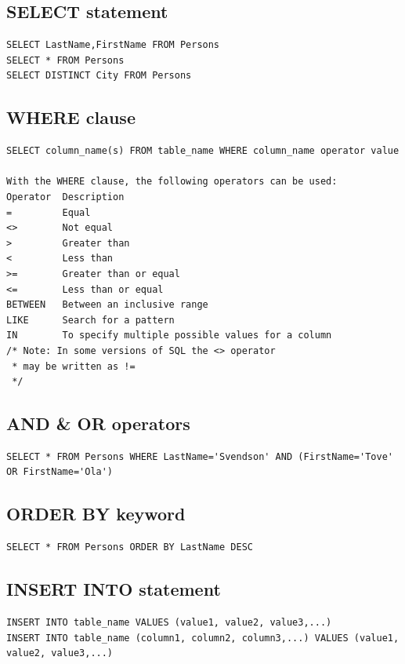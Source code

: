 \subsection{SELECT statement}
\begin{lstlisting}
SELECT LastName,FirstName FROM Persons
SELECT * FROM Persons
SELECT DISTINCT City FROM Persons
\end{lstlisting}

\subsection{WHERE clause}
\begin{lstlisting}
SELECT column_name(s) FROM table_name WHERE column_name operator value

With the WHERE clause, the following operators can be used:
Operator  Description
=         Equal
<>        Not equal
>         Greater than
<         Less than
>=        Greater than or equal
<=        Less than or equal
BETWEEN   Between an inclusive range
LIKE      Search for a pattern
IN        To specify multiple possible values for a column
/* Note: In some versions of SQL the <> operator
 * may be written as !=
 */
\end{lstlisting}

\subsection{AND \& OR operators}
\begin{lstlisting}
SELECT * FROM Persons WHERE LastName='Svendson' AND (FirstName='Tove' OR FirstName='Ola')
\end{lstlisting}

\subsection{ORDER BY keyword}
\begin{lstlisting}
SELECT * FROM Persons ORDER BY LastName DESC
\end{lstlisting}

\subsection{INSERT INTO statement}
\begin{lstlisting}
INSERT INTO table_name VALUES (value1, value2, value3,...)
INSERT INTO table_name (column1, column2, column3,...) VALUES (value1, value2, value3,...)
\end{lstlisting}

